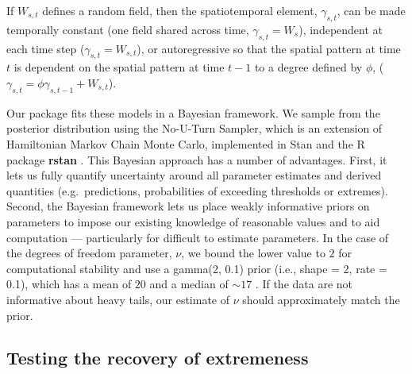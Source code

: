 \documentclass[12pt,english]{article}
\begin{document}
\begin{spacing}{1.9}
If $W_{s,t}$ defines a random field, then the spatiotemporal element,
$\gamma_{s,t}$, can be made temporally constant (one field shared across time,
$\gamma_{s,t} = W_{s}$), independent at each time step ($\gamma_{s,t} =
W_{s,t}$), or autoregressive so that the spatial pattern at time $t$ is
dependent on the spatial pattern at time $t-1$ to a degree defined by $\phi$,
($\gamma_{s,t} = \phi \gamma_{s,t-1} + W_{s,t}$).

Our package fits these models in a Bayesian framework. We sample
from the posterior distribution using the No-U-Turn Sampler, which is an
extension of Hamiltonian Markov Chain Monte Carlo, implemented in Stan
\citep{standevelopmentteam2016a, carpenter2017}
and the R package \textbf{rstan} \citep{standevelopmentteam2016}.
This Bayesian approach has a
number of advantages. First, it lets us fully quantify
uncertainty around all parameter estimates and derived quantities (e.g.\ predictions,
probabilities of exceeding thresholds or extremes). Second, the Bayesian framework
lets us place weakly informative priors on parameters to impose our existing
knowledge of reasonable values and to aid computation --- particularly for
difficult to estimate
parameters. In the case of
the degrees of freedom parameter, $\nu$, we bound the lower value to $2$ for
computational stability and use a gamma(2, 0.1) prior (i.e., shape = 2, rate = 0.1),
which has a mean of $20$ and a median of $\sim 17$ \citep{juarez2010}.
If the data are not informative about heavy
tails, our estimate of $\nu$ should approximately match the prior.

\subsection{Testing the recovery of extremeness}


\end{spacing}
\end{document}
